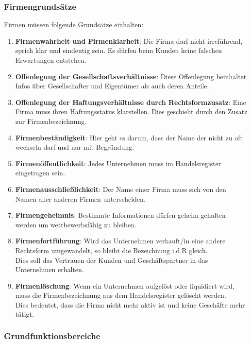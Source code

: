 \documentclass[asp1.tex]{subfiles}
\begin{document}
\subsubsection{Firmengrundsätze}
Firmen müssen folgende Grundsätze einhalten:
\begin{enumerate}
    \item \textbf{Firmenwahrheit und Firmenklarheit}: Die Firma darf nicht irreführend,  sprich klar und eindeutig sein. Es dürfen beim Kunden keine falschen Erwartungen entstehen.
    \item \textbf{Offenlegung der Gesellschaftsverhältnisse}: Diese Offenlegung beinhaltet Infos über Gesellschafter und Eigentümer als auch deren Anteile.
    \item \textbf{Offenlegung der Haftungsverhältnisse durch Rechtsformzusatz}: Eine Firma muss ihren Haftungsstatus klarstellen. Dies geschieht durch den Zusatz zur Firmenbezeichnung.
    \item \textbf{Firmenbeständigkeit}: Hier geht es darum, dass  der Name der nicht zu  oft wechseln darf und nur mit Begründung.
    \item \textbf{Firmenöffentlichkeit}:  Jedes Unternehmen muss im Handelsregister eingetragen sein.
    \item \textbf{Firmenausschließlichkeit}: Der Name einer Firma muss sich von den Namen aller anderen Firmen unterscheiden.
    \item \textbf{Firmengeheimnis}: Bestimmte Informationen dürfen geheim gehalten werden um wettbewerbsfähig zu bleiben.
    \item \textbf{Firmenfortführung}: Wird das Unternehmen  verkauft/in eine  andere Rechtsform umgewandelt, so bleibt die Bezeichnung i.d.R gleich. \\
          Dies soll das Vertrauen der Kunden und Geschäftspartner in das Unternehmen erhalten.
    \item \textbf{Firmenlöschung}: Wenn ein Unternehmen aufgelöst oder liquidiert wird, muss die Firmenbezeichnung aus dem Handelsregister gelöscht werden. \\
          Dies bedeutet, dass die Firma nicht mehr aktiv ist und keine Geschäfte mehr tätigt.
\end{enumerate}

\subsubsection{Grundfunktionsbereiche}
\end{document}
